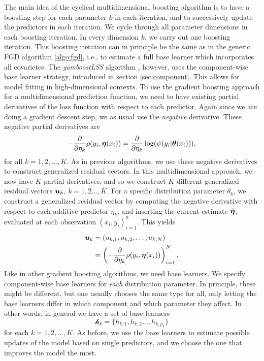 The main idea of the cyclical multidimensional boosting algorithm is to have a boosting step for each parameter $k$ in each iteration, and to successively update the predictors in each iteration.
We cycle through all parameter dimensions in each boosting iteration.
In every dimension $k$, we carry out one boosting iteration.
This boosting iteration can in principle be the same as in the generic FGD algorithm \eqref{algo:fgd}, i.e., to estimate a full base learner which incorporates all covarietes.
The \textit{gamboostLSS} algorithm \citep{gamboostlss-paper}, however, uses the component-wise base learner strategy, introduced in section \ref{sec:component}.
This allows for model fitting in high-dimensional contexts.
To use the gradient boosting approach for a multidimensional prediction function, we need to have existing partial derivatives of the loss function with respect to each predictor.
Again since we are doing a gradient descent step, we as usual use the \textit{negative} derivative.
These negative partial derivatives are
\begin{equation*}
    -\frac{\partial}{\partial\eta_k}\rho(y_i,\boldsymbol{\eta}(x_i))=\frac{\partial}{\partial\eta_k}\log(\psi(y_i|\boldsymbol{\theta}(x_i))),
\end{equation*}
for all $k=1,2,\ldots,K$.
As in previous algorithms, we use these negative derivatives to construct generalized residual vectors.
In this multidimensional approach, we now have $K$ partial derivatives, and so we construct $K$ different generalized residual vectors $\bm{u}_k$, $k=1,2\ldots,K$.
For a specific distribution parameter $\theta_k$, we construct a generalized residual vector by computing the negative derivative with respect to each additive predictor $\eta_k$, and inserting the current estimate $\hat{\boldsymbol{\eta}}$, evaluated at each observation $(x_i,y_i)_{i=1}^n$.
This yields
\begin{align*}
    \bm{u}_k&=(u_{k,1},u_{k,2},\ldots,u_{k,N})\\
    &=\left(-\frac{\partial}{\partial \eta_k}\rho(y_i,\boldsymbol{\eta}(x_i))\right)_{i=1}^N.
\end{align*}
Like in other gradient boosting algorithms, we need base learners.
We specify component-wise base learners for \textit{each} distribution parameter.
In principle, these might be different, but one usually chooses the same type for all, only letting the base learners differ in which component and which parameter they affect.
In other words, in general we have a set of base learners
\begin{equation*}
    \mathcal{h}_{k}=\{h_{k,1},h_{k,2}\ldots,h_{k,p_1}\}
\end{equation*}
for each $k=1,2,\ldots,K$.
As before, we use the base learners to estimate possible updates of the model based on single predictors, and we choose the one that improves the model the most.

